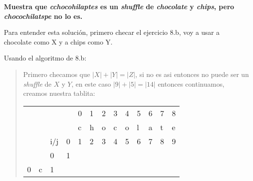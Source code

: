 \textbf{Muestra que \textit{cchocohilaptes} es un \textit{shuffle} de \textit{chocolate} y \textit{chips}, pero \textit{chocochilatspe} no lo es.}\vspace{.2cm}

Para entender esta solución, primero checar el ejercicio 8.b, voy a usar a chocolate como X y a chips como Y.\vspace{.2cm}

\textcolor{bibi}{Usando el algoritmo de 8.b:}\vspace{.2cm}
\begin{quote}
    Primero checamos que $|X|+|Y|=|Z|$, si no es asi entonces no puede ser un \textit{shuffle} de $X$ y $Y$, en este caso $|9|+|5|=|14|$ entonces continuamos, creamos nuestra tablita:  \vspace{.2cm}
    \begin{table}[H]
        \centering
        \begin{tabular}{lllllllllllll}
            &   &                        &                        & 0                     & 1                     & 2                     & 3                     & 4                     & 5                     & 6                     & 7                     & 8                     \\
            &   &                        &                        & c                     & h                     & o                     & c                     & o                     & l                     & a                     & t                     & e                     \\
            &   & i/j                    & 0                      & 1                     & 2                     & 3                     & 4                     & 5                     & 6                     & 7                     & 8                     & 9                     \\ \cline{4-13} 
            &   & \multicolumn{1}{l|}{0} & \multicolumn{1}{l|}{1} & \multicolumn{1}{l|}{} & \multicolumn{1}{l|}{} & \multicolumn{1}{l|}{} & \multicolumn{1}{l|}{} & \multicolumn{1}{l|}{} & \multicolumn{1}{l|}{} & \multicolumn{1}{l|}{} & \multicolumn{1}{l|}{} & \multicolumn{1}{l|}{} \\ \cline{4-13} 
          0 & c & \multicolumn{1}{l|}{1} & \multicolumn{1}{l|}{}  & \multicolumn{1}{l|}{} & \multicolumn{1}{l|}{} & \multicolumn{1}{l|}{} & \multicolumn{1}{l|}{} & \multicolumn{1}{l|}{} & \multicolumn{1}{l|}{} & \multicolumn{1}{l|}{} & \multicolumn{1}{l|}{} & \multicolumn{1}{l|}{} \\ \cline{4-13} 

\end{tabular}
\end{table}
\end{quote}
